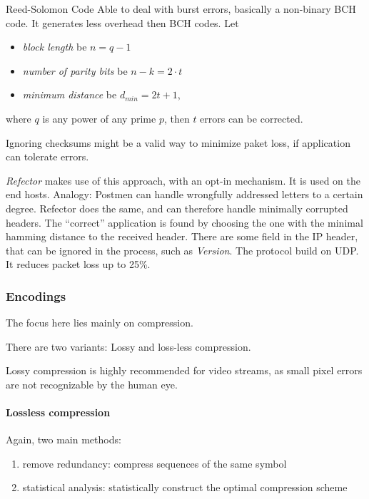 \documentclass[english]{panikzettel}
\begin{document}
	\begin{defi}{Reed-Solomon Code}
		Able to deal with burst errors, basically a non-binary BCH code. It generates less overhead then BCH codes. Let
		\begin{itemize}
			\item \textit{block length} be \( n = q-1 \)
			\item \textit{number of parity bits} be \( n - k= 2 \cdot t \)
			\item \textit{minimum distance} be \( d_{min} = 2t + 1 \),
		\end{itemize}
		where \( q \) is any power of any prime \( p \), then \( t \) errors can be corrected.
	\end{defi}

	Ignoring checksums might be a valid way to minimize paket loss, if application can tolerate errors.

	\textit{Refector} makes use of this approach, with an opt-in mechanism.
	It is used on the end hosts.
	Analogy: Postmen can handle wrongfully addressed letters to a certain degree.
	Refector does the same, and can therefore handle minimally corrupted headers.
	The \enquote{correct} application is found by choosing the one with the minimal hamming distance to the received header. 
	There are some field in the IP header, that can be ignored in the process, such as \textit{Version}.
	The protocol build on UDP.
	It reduces packet loss up to 25\%.

	\subsubsection{Encodings}
	\label{sss-encodings}
	
	The focus here lies mainly on compression.

	There are two variants: Lossy and loss-less compression.

	Lossy compression is highly recommended for video streams, as small pixel errors are not recognizable by the human eye.
	
	\paragraph{Lossless compression}
	\label{pgf-lossless-compression}

	Again, two main methods:
	\begin{enumerate}
		\item remove redundancy: compress sequences of the same symbol 
		\item statistical analysis: statistically construct the optimal compression scheme
	\end{enumerate}
	
\end{document}
